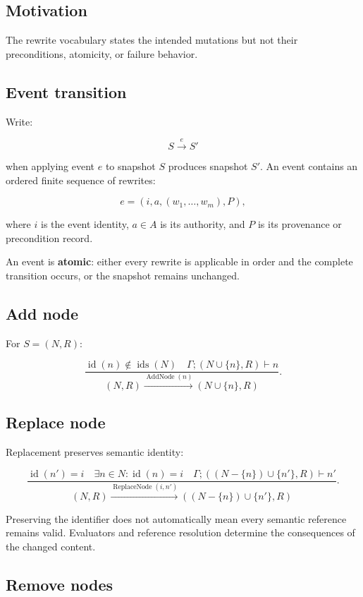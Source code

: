 \documentclass[11pt]{article}
\begin{document}
\subsection{Motivation}

The rewrite vocabulary states the intended mutations but not their
preconditions, atomicity, or failure behavior.

\subsection{Event transition}

Write:

\[
S\xrightarrow{e}S'
\]

when applying event $e$ to snapshot $S$ produces snapshot $S'$. An event
contains an ordered finite sequence of rewrites:

\[
e=(i,a,(w_1,\ldots,w_m),P),
\]

where $i$ is the event identity, $a\in A$ is its authority, and $P$ is its
provenance or precondition record.

An event is \textbf{atomic}: either every rewrite is applicable in order and the
complete transition occurs, or the snapshot remains unchanged.

\subsection{Add node}

For $S=(N,R)$:

\[
\frac{
  \operatorname{id}(n)\notin\operatorname{ids}(N)
  \quad
  \Gamma;(N\cup\{n\},R)\vdash n
}{
  (N,R)\xrightarrow{\operatorname{AddNode}(n)}(N\cup\{n\},R)
}.
\]

\subsection{Replace node}

Replacement preserves semantic identity:

\[
\frac{
  \operatorname{id}(n')=i
  \quad
  \exists n\in N:\operatorname{id}(n)=i
  \quad
  \Gamma;((N-\{n\})\cup\{n'\},R)\vdash n'
}{
  (N,R)\xrightarrow{\operatorname{ReplaceNode}(i,n')}
  ((N-\{n\})\cup\{n'\},R)
}.
\]

Preserving the identifier does not automatically mean every semantic reference
remains valid. Evaluators and reference resolution determine the consequences
of the changed content.

\subsection{Remove nodes}
\end{document}
